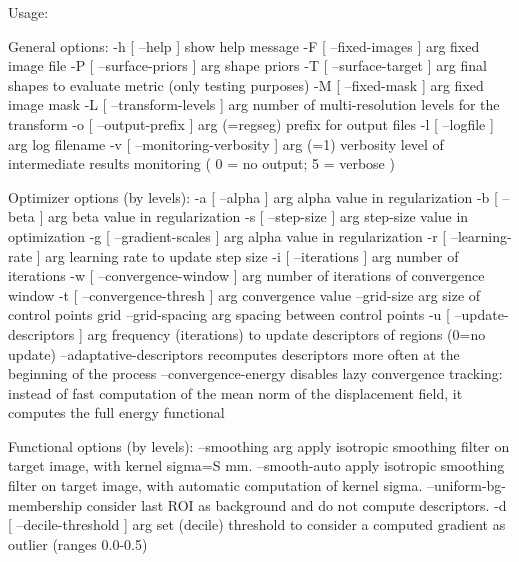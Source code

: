 \documentclass[a4paper]{report}
\begin{document}
\begin{bashcode}
Usage:

General options:
  -h [ --help ]                         show help message
  -F [ --fixed-images ] arg             fixed image file
  -P [ --surface-priors ] arg           shape priors
  -T [ --surface-target ] arg           final shapes to evaluate metric (only
                                        testing purposes)
  -M [ --fixed-mask ] arg               fixed image mask
  -L [ --transform-levels ] arg         number of multi-resolution levels for
                                        the transform
  -o [ --output-prefix ] arg (=regseg)  prefix for output files
  -l [ --logfile ] arg                  log filename
  -v [ --monitoring-verbosity ] arg (=1)
                                        verbosity level of intermediate results
                                        monitoring ( 0 = no output; 5 = verbose
                                        )

Optimizer options (by levels):
  -a [ --alpha ] arg              alpha value in regularization
  -b [ --beta ] arg               beta value in regularization
  -s [ --step-size ] arg          step-size value in optimization
  -g [ --gradient-scales ] arg    alpha value in regularization
  -r [ --learning-rate ] arg      learning rate to update step size
  -i [ --iterations ] arg         number of iterations
  -w [ --convergence-window ] arg number of iterations of convergence window
  -t [ --convergence-thresh ] arg convergence value
  --grid-size arg                 size of control points grid
  --grid-spacing arg              spacing between control points
  -u [ --update-descriptors ] arg frequency (iterations) to update descriptors
                                  of regions (0=no update)
  --adaptative-descriptors        recomputes descriptors more often at the
                                  beginning of the process
  --convergence-energy            disables lazy convergence tracking: instead
                                  of fast computation of the mean norm of the
                                  displacement field, it computes the full
                                  energy functional

Functional options (by levels):
  --smoothing arg               apply isotropic smoothing filter on target
                                image, with kernel sigma=S mm.
  --smooth-auto                 apply isotropic smoothing filter on target
                                image, with automatic computation of kernel
                                sigma.
  --uniform-bg-membership       consider last ROI as background and do not
                                compute descriptors.
  -d [ --decile-threshold ] arg set (decile) threshold to consider a computed
                                gradient as outlier (ranges 0.0-0.5)

\end{bashcode}
\end{document}
